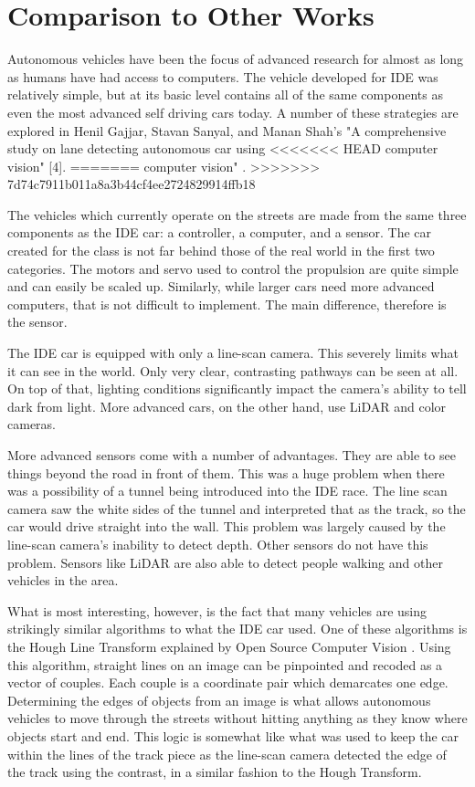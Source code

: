\documentclass[conference]{IEEEtran}
\begin{document}
\section{Comparison to Other Works}
    Autonomous vehicles have been the focus of advanced research for almost as
    long as humans have had access to computers. The vehicle developed for IDE
    was relatively simple, but at its basic level contains all of the same
    components as even the most advanced self driving cars today. A number of
    these strategies are explored in Henil Gajjar, Stavan Sanyal, and Manan
    Shah's "A comprehensive study on lane detecting autonomous car using
<<<<<<< HEAD
    computer vision" [4].
=======
    computer vision" \cite{b2}.
>>>>>>> 7d74c7911b011a8a3b44cf4ee2724829914ffb18
    
    The vehicles which currently operate on the streets are made from the same
    three components as the IDE car: a controller, a computer, and a sensor.
    The car created for the class is not far behind those of the real world
    in the first two categories. The motors and servo used to control the
    propulsion are quite simple and can easily be scaled up. Similarly, while
    larger cars need more advanced computers, that is not difficult to
    implement. The main difference, therefore is the sensor.

    The IDE car is equipped with only a line-scan camera. This severely limits
    what it can see in the world. Only very clear, contrasting pathways can
    be seen at all. On top of that, lighting conditions significantly impact
    the camera's ability to tell dark from light. More advanced cars, on the
    other hand, use LiDAR and color cameras.

    More advanced sensors come with a number of advantages. They are able to
    see things beyond the road in front of them. This was a huge problem when
    there was a possibility of a tunnel being introduced into the IDE race.
    The line scan camera saw the white sides of the tunnel and interpreted 
    that as the track, so the car would drive straight into the wall. This
    problem was largely caused by the line-scan camera's inability to detect
    depth. Other sensors do not have this problem. Sensors like LiDAR are also
    able to detect people walking and other vehicles in the area.

    What is most interesting, however, is the fact that many vehicles are
    using strikingly similar algorithms to what the IDE car used. One of these
    algorithms is the Hough Line Transform explained by Open Source Computer
    Vision \cite{b3}. Using this algorithm, straight lines on an image can be pinpointed
    and recoded as a vector of couples. Each couple is a coordinate pair which
    demarcates one edge. Determining the edges of objects from an image is
    what allows autonomous vehicles to move through the streets without
    hitting anything as they know where objects start and end. This logic is
    somewhat like what was used to keep the car within the lines of the track
    piece as the line-scan camera detected the edge of the track using the
    contrast, in a similar fashion to the Hough Transform.
\end{document}

